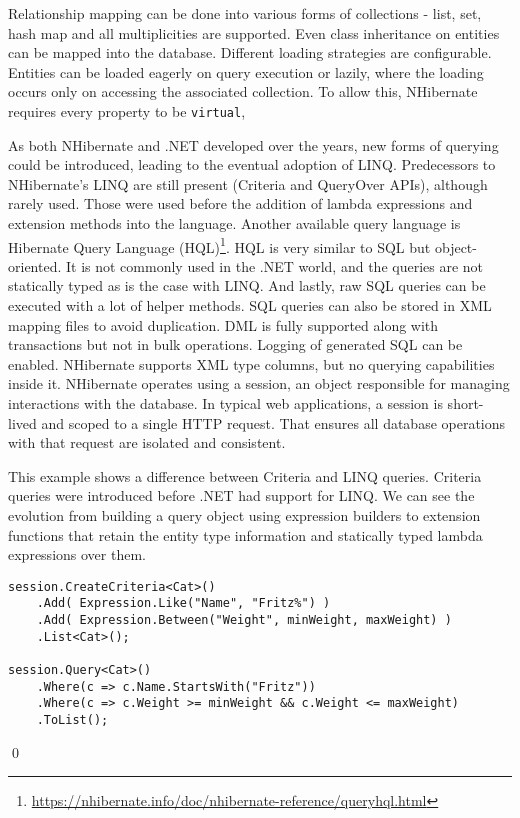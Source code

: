 Relationship mapping can be done into various forms of collections - list, set, hash map and all multiplicities are supported. Even class inheritance on entities can be mapped into the database. Different loading strategies are configurable. Entities can be loaded eagerly on query execution or lazily, where the loading occurs only on accessing the associated collection. To allow this, NHibernate requires every property to be \texttt{virtual},

As both NHibernate and .NET developed over the years, new forms of querying could be introduced, leading to the eventual adoption of LINQ. Predecessors to NHibernate's LINQ are still present (Criteria and QueryOver APIs), although rarely used. Those were used before the addition of lambda expressions and extension methods into the language. Another available query language is Hibernate Query Language (HQL)\footnote{\url{https://nhibernate.info/doc/nhibernate-reference/queryhql.html}}. HQL is very similar to SQL but object-oriented. It is not commonly used in the .NET world, and the queries are not statically typed as is the case with LINQ. And lastly, raw SQL queries can be executed with a lot of helper methods. SQL queries can also be stored in XML mapping files to avoid duplication. DML is fully supported along with transactions but not in bulk operations. Logging of generated SQL can be enabled. NHibernate supports XML type columns, but no querying capabilities inside it. NHibernate operates using a session, an object responsible for managing interactions with the database. In typical web applications, a session is short-lived and scoped to a single HTTP request. That ensures all database operations with that request are isolated and consistent.

\begin{example}
\small
This example\cite{nhibernate} shows a difference between Criteria and LINQ queries. Criteria queries were introduced before .NET had support for LINQ. We can see the evolution from building a query object using expression builders to extension functions that retain the entity type information and statically typed lambda expressions over them. 

\begin{lstlisting}[language=CSharp]
session.CreateCriteria<Cat>()
    .Add( Expression.Like("Name", "Fritz%") )
    .Add( Expression.Between("Weight", minWeight, maxWeight) )
    .List<Cat>();

session.Query<Cat>()
    .Where(c => c.Name.StartsWith("Fritz"))
    .Where(c => c.Weight >= minWeight && c.Weight <= maxWeight)
    .ToList();
\end{lstlisting}
\qed
\end{example}

